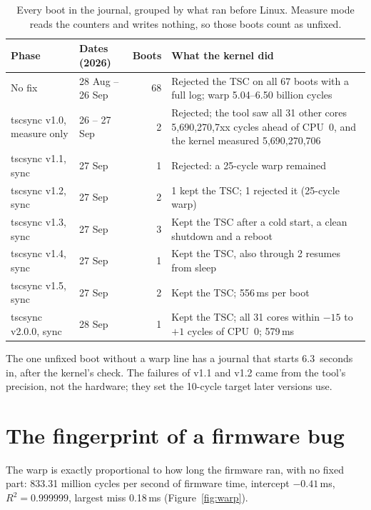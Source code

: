 \documentclass[11pt,a4paper]{article}
\begin{document}
\begin{table}[ht]
\centering
\small
\begin{tabularx}{\textwidth}{@{}l l r L@{}}
\toprule
Phase & Dates (2026) & Boots & What the kernel did \\
\midrule
No fix & 28 Aug -- 26 Sep & 68 & Rejected the TSC on all 67 boots with a full
  log; warp 5.04--6.50 billion cycles \\
tscsync v1.0, measure only & 26 -- 27 Sep & 2 & Rejected; the tool saw all
  31 other cores 5,690,270,7xx cycles ahead of CPU~0, and the kernel measured
  5,690,270,706 \\
tscsync v1.1, sync & 27 Sep & 1 & Rejected: a 25-cycle warp remained \\
tscsync v1.2, sync & 27 Sep & 2 & 1 kept the TSC; 1 rejected it (25-cycle
  warp) \\
tscsync v1.3, sync & 27 Sep & 3 & Kept the TSC after a cold start, a clean
  shutdown and a reboot \\
tscsync v1.4, sync & 27 Sep & 1 & Kept the TSC, also through 2 resumes from
  sleep \\
tscsync v1.5, sync & 27 Sep & 2 & Kept the TSC; 556\,ms per boot \\
tscsync v2.0.0, sync & 28 Sep & 1 & Kept the TSC; all 31 cores within $-15$
  to $+1$ cycles of CPU~0; 579\,ms \\
\bottomrule
\end{tabularx}
\caption{Every boot in the journal, grouped by what ran before Linux. Measure
mode reads the counters and writes nothing, so those boots count as unfixed.}
\label{tab:history}
\end{table}

The one unfixed boot without a warp line has a journal that starts
6.3~seconds in, after the kernel's check. The failures of v1.1 and v1.2 came
from the tool's precision, not the hardware; they set the 10-cycle target
later versions use.

\section{The fingerprint of a firmware bug}

The warp is exactly proportional to how long the firmware ran, with no fixed
part: 833.31 million cycles per second of firmware time, intercept
$-0.41$\,ms, $R^2 = 0.999999$, largest miss 0.18\,ms
(Figure~\ref{fig:warp}).
\end{document}
